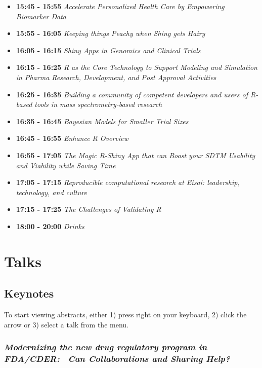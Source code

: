 \documentclass[]{book}
\theoremstyle{definition}
\theoremstyle{definition}
\theoremstyle{definition}
\theoremstyle{remark}
\begin{document}
\begin{itemize}
\item
  \textbf{15:45 - 15:55} \emph{Accelerate Personalized Health Care by
  Empowering Biomarker Data}
\item
  \textbf{15:55 - 16:05} \emph{Keeping things Peachy when Shiny gets
  Hairy}
\item
  \textbf{16:05 - 16:15} \emph{Shiny Apps in Genomics and Clinical
  Trials}
\item
  \textbf{16:15 - 16:25} \emph{R as the Core Technology to Support
  Modeling and Simulation in Pharma Research, Development, and Post
  Approval Activities}
\item
  \textbf{16:25 - 16:35} \emph{Building a community of competent
  developers and users of R-based tools in mass spectrometry-based
  research}
\item
  \textbf{16:35 - 16:45} \emph{Bayesian Models for Smaller Trial Sizes}
\item
  \textbf{16:45 - 16:55} \emph{Enhance R Overview}
\item
  \textbf{16:55 - 17:05} \emph{The Magic R-Shiny App that can Boost your
  SDTM Usability and Viability while Saving Time}
\item
  \textbf{17:05 - 17:15} \emph{Reproducible computational research at
  Eisai: leadership, technology, and culture}
\item
  \textbf{17:15 - 17:25} \emph{The Challenges of Validating R}
\item
  \textbf{18:00 - 20:00} \emph{Drinks}
\end{itemize}

\hypertarget{part-talks}{%
\part{Talks}\label{part-talks}}

\hypertarget{keynotes}{%
\chapter{Keynotes}\label{keynotes}}

To start viewing abstracts, either 1) press right on your keyboard, 2)
click the arrow or 3) select a talk from the menu.

\hypertarget{modernizing-the-new-drug-regulatory-program-in-fdacder-can-collaborations-and-sharing-help}{%
\section{\texorpdfstring{\emph{Modernizing the new drug regulatory
program in FDA/CDER:~ Can Collaborations and Sharing
Help?}}{Modernizing the new drug regulatory program in FDA/CDER:~ Can Collaborations and Sharing Help?}}\label{modernizing-the-new-drug-regulatory-program-in-fdacder-can-collaborations-and-sharing-help}}
\end{document}
